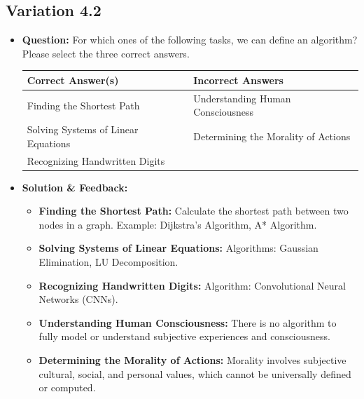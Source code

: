 \subsection{Variation 4.2}
\begin{itemize}
    \item \textbf{Question:} For which ones of the following tasks, we can define an algorithm? Please select the three correct answers.
    
    \begin{tabular}{|l|l|}
        \hline
        \textbf{Correct Answer(s)} & \textbf{Incorrect Answers} \\
        \hline
        Finding the Shortest Path & Understanding Human Consciousness \\
        Solving Systems of Linear Equations & Determining the Morality of Actions \\
        Recognizing Handwritten Digits & \\
        \hline
    \end{tabular}
    
    \item \textbf{Solution \& Feedback:}
    \begin{itemize}
        \item \textbf{Finding the Shortest Path:} Calculate the shortest path between two nodes in a graph. Example: Dijkstra's Algorithm, A* Algorithm.
        \item \textbf{Solving Systems of Linear Equations:} Algorithms: Gaussian Elimination, LU Decomposition.
        \item \textbf{Recognizing Handwritten Digits:} Algorithm: Convolutional Neural Networks (CNNs).
        \item \textbf{Understanding Human Consciousness:} There is no algorithm to fully model or understand subjective experiences and consciousness.
        \item \textbf{Determining the Morality of Actions:} Morality involves subjective cultural, social, and personal values, which cannot be universally defined or computed.
    \end{itemize}
\end{itemize}

